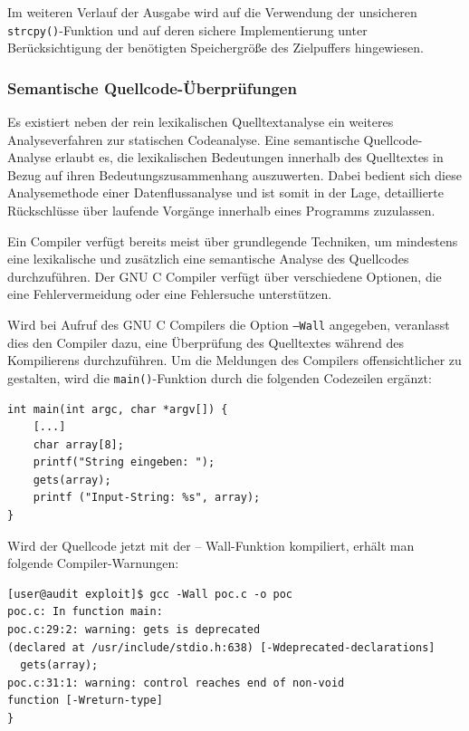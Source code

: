 Im weiteren Verlauf der Ausgabe wird auf die Verwendung der 
unsicheren \texttt{strcpy()}-Funktion und auf deren sichere 
Implementierung unter Berücksichtigung der benötigten Speichergröße 
des Zielpuffers hingewiesen.

\subsubsection{Semantische Quellcode-Überprüfungen}

Es existiert neben der rein lexikalischen Quelltextanalyse ein weiteres 
Analyseverfahren zur statischen Codeanalyse. Eine semantische 
Quellcode-Analyse erlaubt es, die lexikalischen Bedeutungen innerhalb des 
Quelltextes in Bezug auf ihren Bedeutungszusammenhang auszuwerten. 
Dabei bedient sich diese Analysemethode einer Datenflussanalyse und ist 
somit in der Lage, detaillierte Rückschlüsse über laufende Vorgänge 
innerhalb eines Programms zuzulassen.


Ein Compiler verfügt bereits meist über grundlegende Techniken, 
um mindestens eine lexikalische und zusätzlich eine semantische Analyse 
des Quellcodes durchzuführen. Der GNU C Compiler verfügt über verschiedene 
Optionen, die eine Fehlervermeidung oder eine Fehlersuche unterstützen.

Wird bei Aufruf des GNU C Compilers die Option \texttt{–Wall} angegeben, 
veranlasst dies den Compiler dazu, eine Überprüfung des Quelltextes 
während des Kompilierens durchzuführen. Um die Meldungen des Compilers 
offensichtlicher zu gestalten, wird die \texttt{main()}-Funktion durch 
die folgenden Codezeilen ergänzt:

\begin{lstlisting}[basicstyle=\ttfamily\footnotesize]
int main(int argc, char *argv[]) {
    [...]
    char array[8];
    printf("String eingeben: ");
    gets(array);
    printf ("Input-String: %s", array);
}
\end{lstlisting}

Wird der Quellcode jetzt mit der – Wall-Funktion kompiliert, erhält man 
folgende Compiler-Warnungen:

\begin{lstlisting}[basicstyle=\ttfamily\footnotesize]
[user@audit exploit]$ gcc -Wall poc.c -o poc
poc.c: In function main:
poc.c:29:2: warning: gets is deprecated 
(declared at /usr/include/stdio.h:638) [-Wdeprecated-declarations]
  gets(array);
poc.c:31:1: warning: control reaches end of non-void 
function [-Wreturn-type]
}
\end{lstlisting}

